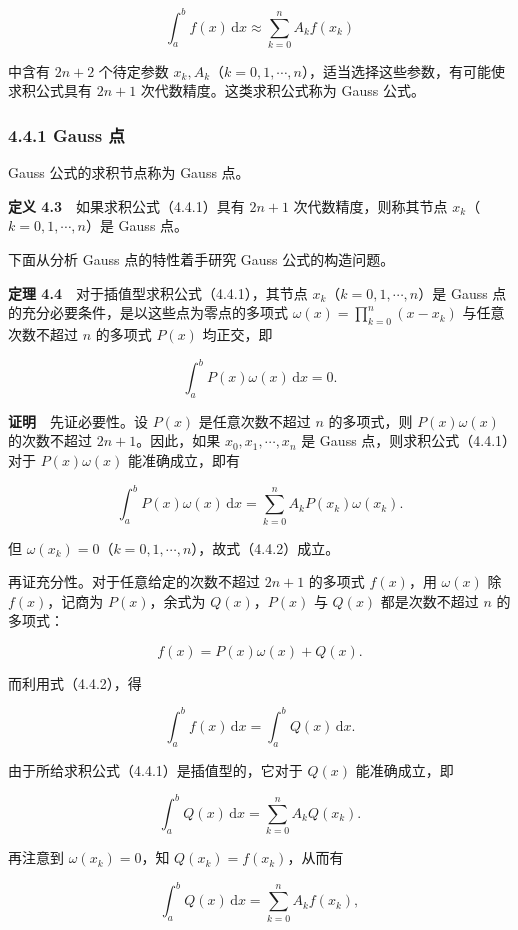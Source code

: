 \documentclass[
  10pt,
  fontset=fandol]{ctexart}
\begin{document}
\[
\int_a^b f(x)\,\mathrm{d}x\approx\sum_{k=0}^{n}A_kf(x_k)
\tag{4.4.1}
\]

中含有 \(2n+2\) 个待定参数 \(x_k,A_k\)（\(k=0,1,\cdots,n\)），适当选择这些参数，有可能使求积公式具有 \(2n+1\) 次代数精度。这类求积公式称为 Gauss 公式。

\subsubsection{4.4.1 Gauss 点}\label{gauss-ux70b9}

Gauss 公式的求积节点称为 Gauss 点。

\textbf{定义 4.3}　如果求积公式（4.4.1）具有 \(2n+1\) 次代数精度，则称其节点 \(x_k\)（\(k=0,1,\cdots,n\)）是 Gauss 点。

下面从分析 Gauss 点的特性着手研究 Gauss 公式的构造问题。

\textbf{定理 4.4}　对于插值型求积公式（4.4.1），其节点 \(x_k\)（\(k=0,1,\cdots,n\)）是 Gauss 点的充分必要条件，是以这些点为零点的多项式 \(\displaystyle\omega(x)=\prod_{k=0}^{n}(x-x_k)\) 与任意次数不超过 \(n\) 的多项式 \(P(x)\) 均正交，即

\[
\int_a^b P(x)\omega(x)\,\mathrm{d}x=0.
\tag{4.4.2}
\]

\textbf{证明}　先证必要性。设 \(P(x)\) 是任意次数不超过 \(n\) 的多项式，则 \(P(x)\omega(x)\) 的次数不超过 \(2n+1\)。因此，如果 \(x_0,x_1,\cdots,x_n\) 是 Gauss 点，则求积公式（4.4.1）对于 \(P(x)\omega(x)\) 能准确成立，即有

\[
\int_a^b P(x)\omega(x)\,\mathrm{d}x
=\sum_{k=0}^{n}A_kP(x_k)\omega(x_k).
\]

但 \(\omega(x_k)=0\)（\(k=0,1,\cdots,n\)），故式（4.4.2）成立。

再证充分性。对于任意给定的次数不超过 \(2n+1\) 的多项式 \(f(x)\)，用 \(\omega(x)\) 除 \(f(x)\)，记商为 \(P(x)\)，余式为 \(Q(x)\)，\(P(x)\) 与 \(Q(x)\) 都是次数不超过 \(n\) 的多项式：

\[
f(x)=P(x)\omega(x)+Q(x).
\]

而利用式（4.4.2），得

\[
\int_a^b f(x)\,\mathrm{d}x=\int_a^b Q(x)\,\mathrm{d}x.
\tag{4.4.3}
\]

由于所给求积公式（4.4.1）是插值型的，它对于 \(Q(x)\) 能准确成立，即

\[
\int_a^b Q(x)\,\mathrm{d}x=\sum_{k=0}^{n}A_kQ(x_k).
\]

再注意到 \(\omega(x_k)=0\)，知 \(Q(x_k)=f(x_k)\)，从而有

\[
\int_a^b Q(x)\,\mathrm{d}x=\sum_{k=0}^{n}A_kf(x_k),
\]
\end{document}
